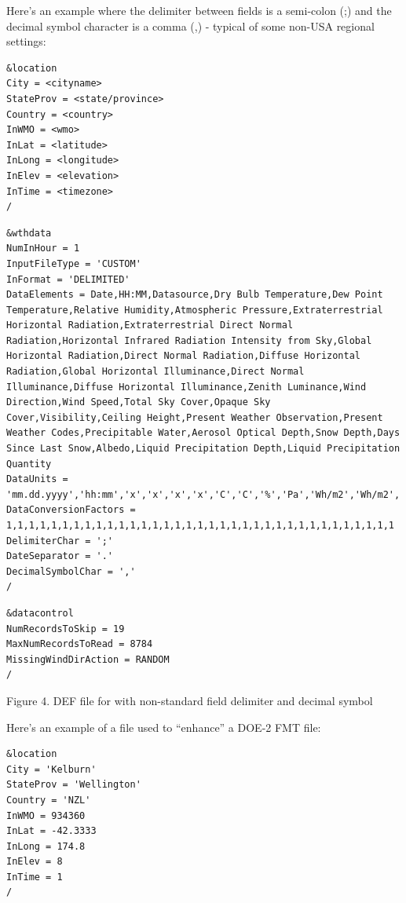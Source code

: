 Here's an example where the delimiter between fields is a semi-colon (;) and the decimal symbol character is a comma (,) - typical of some non-USA regional settings:

\begin{lstlisting}
&location
City = <cityname>
StateProv = <state/province>
Country = <country>
InWMO = <wmo>
InLat = <latitude>
InLong = <longitude>
InElev = <elevation>
InTime = <timezone>
/
\end{lstlisting}

\begin{lstlisting}
&wthdata
NumInHour = 1
InputFileType = 'CUSTOM'
InFormat = 'DELIMITED'
DataElements = Date,HH:MM,Datasource,Dry Bulb Temperature,Dew Point Temperature,Relative Humidity,Atmospheric Pressure,Extraterrestrial Horizontal Radiation,Extraterrestrial Direct Normal Radiation,Horizontal Infrared Radiation Intensity from Sky,Global Horizontal Radiation,Direct Normal Radiation,Diffuse Horizontal Radiation,Global Horizontal Illuminance,Direct Normal Illuminance,Diffuse Horizontal Illuminance,Zenith Luminance,Wind Direction,Wind Speed,Total Sky Cover,Opaque Sky Cover,Visibility,Ceiling Height,Present Weather Observation,Present Weather Codes,Precipitable Water,Aerosol Optical Depth,Snow Depth,Days Since Last Snow,Albedo,Liquid Precipitation Depth,Liquid Precipitation Quantity
DataUnits = 'mm.dd.yyyy','hh:mm','x','x','x','x','C','C','%','Pa','Wh/m2','Wh/m2','Wh/m2','Wh/m2','Wh/m2','Wh/m2','lux','lux','lux','Cd/m2','deg','m/s','tenths','tenths','km','m','x','x','mm','{.001}','cm','x','{.01}','mm','hr'
DataConversionFactors = 1,1,1,1,1,1,1,1,1,1,1,1,1,1,1,1,1,1,1,1,1,1,1,1,1,1,1,1,1,1,1,1,1,1,1
DelimiterChar = ';'
DateSeparator = '.'
DecimalSymbolChar = ','
/
\end{lstlisting}

\begin{lstlisting}
&datacontrol
NumRecordsToSkip = 19
MaxNumRecordsToRead = 8784
MissingWindDirAction = RANDOM
/
\end{lstlisting}

Figure 4. DEF file for with non-standard field delimiter and decimal symbol

Here's an example of a file used to ``enhance'' a DOE-2 FMT file:

\begin{lstlisting}
&location
City = 'Kelburn'
StateProv = 'Wellington'
Country = 'NZL'
InWMO = 934360
InLat = -42.3333
InLong = 174.8
InElev = 8
InTime = 1
/
\end{lstlisting}


